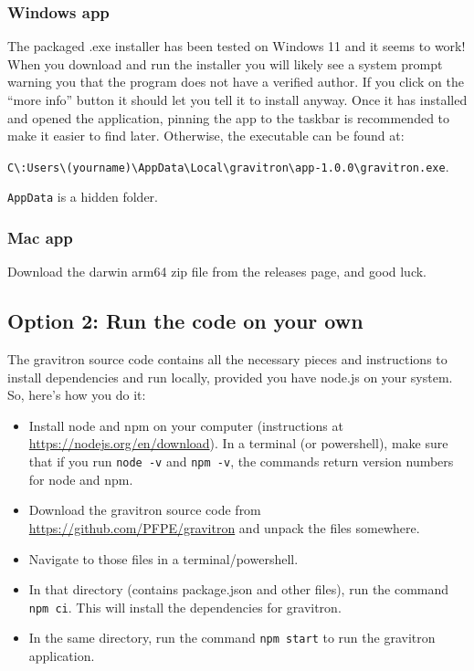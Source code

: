 \documentclass{pfpe-manual}
\begin{document}
\subsubsection{Windows app}
The packaged .exe installer has been tested on Windows 11 and it seems to work! When you download and run the installer you will likely see a system prompt warning you that the program does not have a verified author. If you click on the ``more info'' button it should let you tell it to install anyway. Once it has installed and opened the application, pinning the app to the taskbar is recommended to make it easier to find later. Otherwise, the executable can be found at: 

\texttt{C\textbackslash :Users\textbackslash (yourname)\textbackslash AppData\textbackslash Local\textbackslash gravitron\textbackslash app-1.0.0\textbackslash gravitron.exe}. 

\noindent \texttt{AppData} is a hidden folder.

\subsubsection{Mac app}
Download the darwin arm64 zip file from the releases page, and good luck.

\subsection{Option 2: Run the code on your own}
\label{runwithnode}
The gravitron source code contains all the necessary pieces and instructions to install dependencies and run locally, provided you have node.js on your system. So, here's how you do it:
\begin{itemize}
    \item Install node and npm on your computer (instructions at \url{https://nodejs.org/en/download}). In a terminal (or powershell), make sure that if you run \texttt{node -v} and \texttt{npm -v}, the commands return version numbers for node and npm.
    \item Download the gravitron source code from \url{https://github.com/PFPE/gravitron} and unpack the files somewhere.
    \item Navigate to those files in a terminal/powershell.
    \item In that directory (contains package.json and other files), run the command \texttt{npm ci}. This will install the dependencies for gravitron.
    \item In the same directory, run the command \texttt{npm start} to run the gravitron application. 
\end{itemize}
\end{document}
